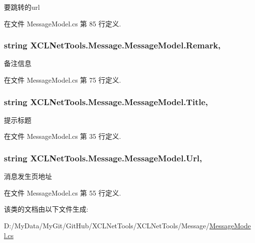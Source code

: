 要跳转的url 



在文件 Message\-Model.\-cs 第 85 行定义.

\hypertarget{class_x_c_l_net_tools_1_1_message_1_1_message_model_a9cbdcd7db26f62ea746c835e82e3dcf0}{
\subsubsection[{Remark}]{\setlength{\rightskip}{0pt plus 5cm}string X\-C\-L\-Net\-Tools.\-Message.\-Message\-Model.\-Remark\hspace{0.3cm}{\ttfamily [get]}, {\ttfamily [set]}}}\label{class_x_c_l_net_tools_1_1_message_1_1_message_model_a9cbdcd7db26f62ea746c835e82e3dcf0}


备注信息 



在文件 Message\-Model.\-cs 第 75 行定义.

\hypertarget{class_x_c_l_net_tools_1_1_message_1_1_message_model_a580b7fe7f6918b6803a7e7b8e656905b}{
\subsubsection[{Title}]{\setlength{\rightskip}{0pt plus 5cm}string X\-C\-L\-Net\-Tools.\-Message.\-Message\-Model.\-Title\hspace{0.3cm}{\ttfamily [get]}, {\ttfamily [set]}}}\label{class_x_c_l_net_tools_1_1_message_1_1_message_model_a580b7fe7f6918b6803a7e7b8e656905b}


提示标题 



在文件 Message\-Model.\-cs 第 35 行定义.

\hypertarget{class_x_c_l_net_tools_1_1_message_1_1_message_model_a50c6a9523a8b8dc168360318f7be8574}{
\subsubsection[{Url}]{\setlength{\rightskip}{0pt plus 5cm}string X\-C\-L\-Net\-Tools.\-Message.\-Message\-Model.\-Url\hspace{0.3cm}{\ttfamily [get]}, {\ttfamily [set]}}}\label{class_x_c_l_net_tools_1_1_message_1_1_message_model_a50c6a9523a8b8dc168360318f7be8574}


消息发生页地址 



在文件 Message\-Model.\-cs 第 55 行定义.



该类的文档由以下文件生成\-:\begin{DoxyCompactItemize}
\item 
D\-:/\-My\-Data/\-My\-Git/\-Git\-Hub/\-X\-C\-L\-Net\-Tools/\-X\-C\-L\-Net\-Tools/\-Message/\hyperlink{_message_model_8cs}{Message\-Model.\-cs}\end{DoxyCompactItemize}
